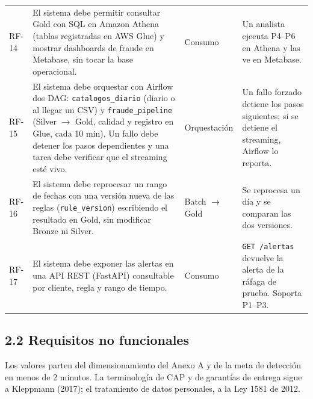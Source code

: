 \documentclass[12pt,letterpaper]{article}
\newcommand{\code}[1]{{\small\texttt{#1}}}
\begin{document}
\begin{footnotesize}
\begin{longtable}{@{}P{0.45in}P{2.85in}P{0.95in}P{2.05in}@{}}
RF-14 & El sistema debe permitir consultar Gold con SQL en Amazon Athena (tablas registradas en AWS Glue) y mostrar dashboards de fraude en Metabase, sin tocar la base operacional. & Consumo & Un analista ejecuta P4--P6 en Athena y las ve en Metabase.\\[1pt]
RF-15 & El sistema debe orquestar con Airflow dos DAG: \code{catalogos\_diario} (diario o al llegar un CSV) y \code{fraude\_pipeline} (Silver $\rightarrow$ Gold, calidad y registro en Glue, cada 10 min). Un fallo debe detener los pasos dependientes y una tarea debe verificar que el streaming esté vivo. & Orquestación & Un fallo forzado detiene los pasos siguientes; si se detiene el streaming, Airflow lo reporta.\\[1pt]
RF-16 & El sistema debe reprocesar un rango de fechas con una versión nueva de las reglas (\code{rule\_version}) escribiendo el resultado en Gold, sin modificar Bronze ni Silver. & Batch $\rightarrow$ Gold & Se reprocesa un día y se comparan las dos versiones.\\[1pt]
RF-17 & El sistema debe exponer las alertas en una API REST (FastAPI) consultable por cliente, regla y rango de tiempo. & Consumo & \code{GET /alertas} devuelve la alerta de la ráfaga de prueba. Soporta P1--P3.\\
\end{longtable}
\end{footnotesize}

\subsection*{2.2 Requisitos no funcionales}

Los valores parten del dimensionamiento del Anexo A y de la meta de detección en menos de 2 minutos. La terminología de CAP y de garantías de entrega sigue a Kleppmann (2017); el tratamiento de datos personales, a la Ley 1581 de 2012.
\end{document}
